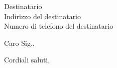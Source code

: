 \documentclass[a4paper,11pt]{letter}
\begin{document}
\begin{letter}{Destinatario\\Indirizzo del destinatario\\Numero di telefono del destinatario}
	
\opening{Caro Sig.,}


\closing{Cordiali saluti,}


\end{letter}
\end{document}
